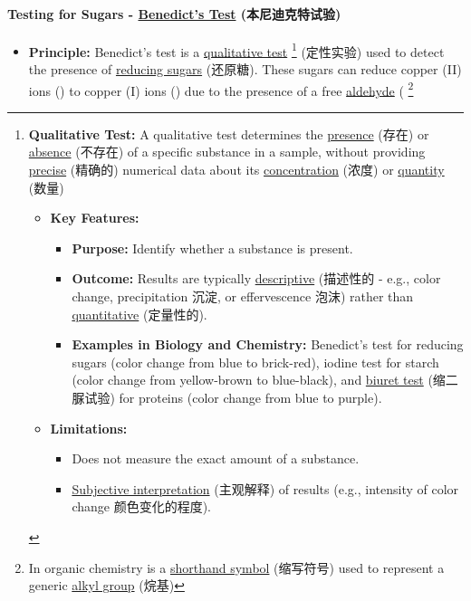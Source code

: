 \paragraph{Testing for Sugars - \underline{Benedict's Test} (本尼迪克特试验)}
\begin{itemize}
    \item \textbf{Principle:} Benedict's test is a \underline{qualitative test} \footnote{\textbf{Qualitative Test:} A qualitative
    test determines the \underline{presence} (存在) or \underline{absence} (不存在) of a specific substance in a sample, without
    providing \underline{precise} (精确的) numerical data about its \underline{concentration} (浓度) or \underline{quantity} (数量)
    \begin{itemize}
        \item \textbf{Key Features:}
        \begin{itemize}
            \item \textbf{Purpose:} Identify whether a substance is present.
            \item \textbf{Outcome:} Results are typically \underline{descriptive} (描述性的 - e.g., color change, precipitation
            沉淀, or effervescence 泡沫) rather than \underline{quantitative} (定量性的).
            \item \textbf{Examples in Biology and Chemistry:} Benedict's test for reducing sugars (color change from blue to
            brick-red), iodine test for starch (color change from yellow-brown to blue-black), and \underline{biuret test}
            (缩二脲试验) for proteins (color change from blue to purple).
        \end{itemize}
        \item \textbf{Limitations:}
        \begin{itemize}
            \item Does not measure the exact amount of a substance.
            \item \underline{Subjective interpretation} (主观解释)  of results (e.g., intensity of color change 颜色变化的程度).
        \end{itemize}
    \end{itemize}} (定性实验) used to detect the presence of \underline{reducing sugars} (还原糖). These sugars can reduce copper
    (II) ions () to copper (I) ions () due to the presence of a free \underline{aldehyde} ( \footnote{In
    organic chemistry  is a \underline{shorthand symbol} (缩写符号) used to represent a generic \underline{alkyl group} (烷基)
}
\end{itemize}
